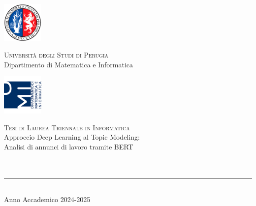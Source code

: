 \thispagestyle{empty}

\noindent
\includegraphics[width=0.15\textwidth]{img/logoUniPg}
\begin{minipage}[b]{0.7\textwidth}
    \centering
    {\Large \textsc{Universit\`a degli Studi di Perugia}}\\[0.4em]
    {\large Dipartimento di Matematica e Informatica}
\end{minipage}%
\includegraphics[width=0.15\textwidth]{img/logoDMI}

\vspace{5em}

\begin{center}
    {\large \textsc{Tesi di Laurea Triennale in Informatica}}\\[8em]
    {\Huge Approccio Deep Learning al Topic Modeling:\\ Analisi di annunci di lavoro tramite BERT}\\[8.4em]
    \\[1em]
    \\[3em]
    \vfill
    {\rule{380pt}{0.4pt}}\\[1.1em]
    {Anno Accademico 2024-2025}
\end{center}
